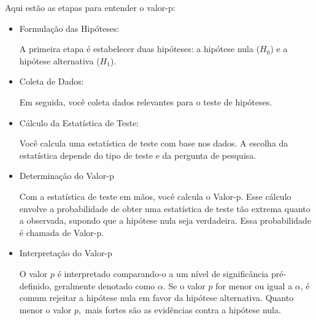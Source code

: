 \documentclass[12pt]{beamer}
\begin{document}
\begin{frame}{}
\begin{block}{Aqui estão as etapas para entender o valor-p:}

\begin{itemize}
\justifying
\item Formulação das Hipóteses:

A primeira etapa é estabelecer duas hipóteses: a hipótese nula ($H_0$) e a hipótese alternativa ($H_1$). \pause

\item Coleta de Dados:

Em seguida, você coleta dados relevantes para o teste de hipóteses.\pause

\item Cálculo da Estatística de Teste:

Você calcula uma estatística de teste com base nos dados. A escolha da estatística depende do tipo de teste e da pergunta de pesquisa.
\end{itemize}
\end{block}
\end{frame}

\begin{frame}{}
\begin{block}{}
\justifying
\begin{itemize}
\justifying
\item Determinação do Valor-p 

Com a estatística de teste em mãos, você calcula o Valor-p. Esse cálculo envolve a probabilidade de obter uma estatística de teste tão extrema quanto a observada, supondo que a hipótese nula seja verdadeira. Essa probabilidade é chamada de Valor-p.\pause

\item Interpretação do Valor-p 

O valor $p$ é interpretado comparando-o a um nível de significância pré-definido, geralmente denotado como $\alpha$. Se o valor $p$ for menor ou igual a $\alpha$, é comum rejeitar a hipótese nula em favor da hipótese alternativa. Quanto menor o valor $p,$ mais fortes são as evidências contra a hipótese nula.
\end{itemize}
\end{block}
\end{frame}
\end{document}
